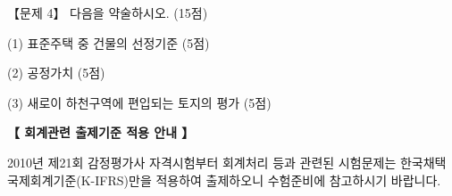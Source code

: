 \begin{longquestion}{【문제 4】}
다음을 약술하시오. (15점) \par
\medskip\noindent (1) 표준주택 중 건물의 선정기준 (5점) \par
\medskip\noindent (2) 공정가치 (5점) \par
\medskip\noindent (3) 새로이 하천구역에 편입되는 토지의 평가 (5점) \par
\medskip
\begin{framedtext}
\centering\textbf{【 회계관련 출제기준 적용 안내 】}\par
2010년 제21회 감정평가사 자격시험부터 회계처리 등과 관련된 시험문제는 한국채택국제회계기준(K-IFRS)만을 적용하여 출제하오니 수험준비에 참고하시기 바랍니다.
\end{framedtext}
\end{longquestion}
